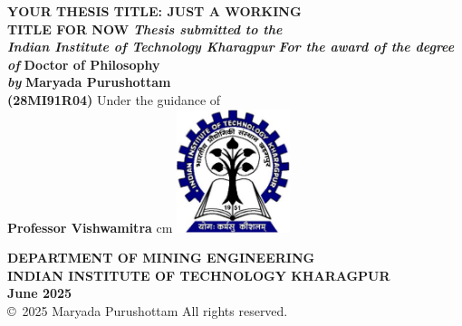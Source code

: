 \newpage
\thispagestyle{empty}

\begin{titlepage}
\begin{center}
{\fontsize{10pt}{13pt}\selectfont
%
\textbf{\Large YOUR THESIS TITLE:  JUST A WORKING \vspace{0.3cm}\\ TITLE FOR NOW}
\vskip1.4cm
\textbf{\large\emph{Thesis submitted to the\\Indian Institute of Technology Kharagpur}}
\singlespacing
\textbf{\large\emph{For the award of the degree\\\vspace{0.4cm}of}}
\singlespacing
\textbf {\Large Doctor of Philosophy}\\
\singlespacing
\textbf {\large\emph{by}}
\textbf{\Large Maryada Purushottam}\\
\textbf{\large (28MI91R04)}
\vskip0.5cm
{\large Under the guidance of}\\
\singlespacing
\textbf{\large{Professor Vishwamitra}}
 cm
\includegraphics[height=36mm]{"./Figures/kgp_logo.pdf"}
\doublespacing
\begin{center}
\textbf{\large{DEPARTMENT OF MINING ENGINEERING\\ INDIAN INSTITUTE OF TECHNOLOGY KHARAGPUR\\\singlespacing June 2025}}\\\singlespacing
\copyright~2025 Maryada Purushottam All rights reserved.
\end{center}
}
\end{center}
\end{titlepage}








